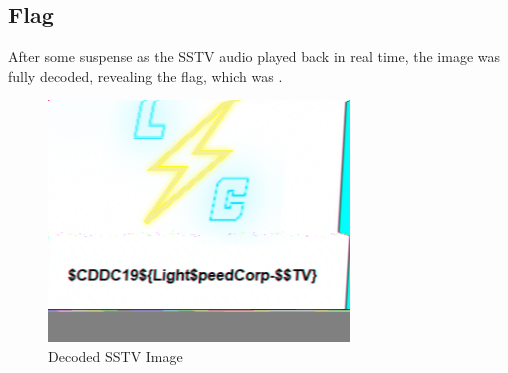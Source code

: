 
	\subsection{Flag}
		After some suspense as the SSTV audio played back in real time, the image was fully decoded, revealing the flag, which
		was .

		\begin{figure}[!htbp]\centering
			\includegraphics[width=80mm]{figures/sstv/SSTV.png} \vspace{5mm}
			\caption{Decoded SSTV Image}
		\end{figure}
